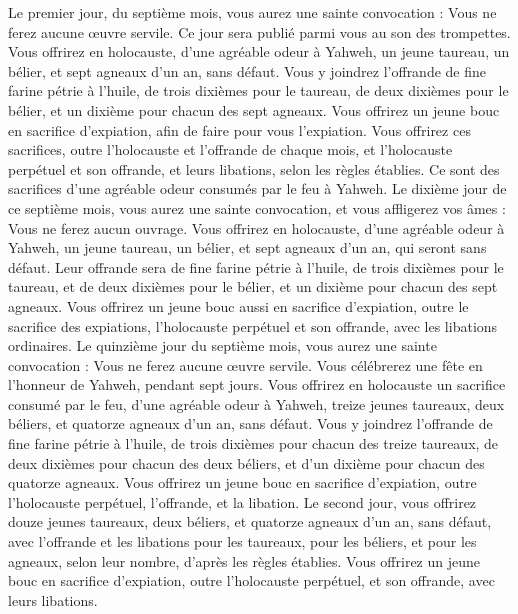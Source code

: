 \begin{multicols}{2}
\VerseOne{}Le premier jour, du septième mois, vous aurez une sainte convocation : Vous ne ferez aucune œuvre servile. Ce jour sera publié parmi vous au son des trompettes.
Vous offrirez en holocauste, d’une agréable odeur à Yahweh, un jeune taureau, un bélier, et sept agneaux d'un an, sans défaut.
Vous y joindrez l’offrande de fine farine pétrie à l'huile, de trois dixièmes pour le taureau, de deux dixièmes pour le bélier,
et un dixième pour chacun des sept agneaux.
Vous offrirez un jeune bouc en sacrifice d’expiation, afin de faire pour vous l’expiation.
Vous offrirez ces sacrifices, outre l'holocauste et l’offrande de chaque mois, et l'holocauste perpétuel et son offrande, et leurs libations, selon les règles établies. Ce sont des sacrifices d’une agréable odeur consumés par le feu à Yahweh.
Le dixième jour de ce septième mois, vous aurez une sainte convocation, et vous affligerez vos âmes : Vous ne ferez aucun ouvrage.
Vous offrirez en holocauste, d’une agréable odeur à Yahweh, un jeune taureau, un bélier, et sept agneaux d'un an, qui seront sans défaut.
Leur offrande sera de fine farine pétrie à l'huile, de trois dixièmes pour le taureau, et de deux dixièmes pour le bélier,
et un dixième pour chacun des sept agneaux.
Vous offrirez un jeune bouc aussi en sacrifice d’expiation, outre le sacrifice des expiations, l'holocauste perpétuel et son offrande, avec les libations ordinaires.
Le quinzième jour du septième mois, vous aurez une sainte convocation : Vous ne ferez aucune œuvre servile. Vous célébrerez une fête en l’honneur de Yahweh, pendant sept jours.
Vous offrirez en holocauste un sacrifice consumé par le feu, d’une agréable odeur à Yahweh, treize jeunes taureaux, deux béliers, et quatorze agneaux d'un an, sans défaut.
Vous y joindrez l’offrande de fine farine pétrie à l'huile, de trois dixièmes pour chacun des treize taureaux, de deux dixièmes pour chacun des deux béliers,
et d'un dixième pour chacun des quatorze agneaux.
Vous offrirez un jeune bouc en sacrifice d’expiation, outre l'holocauste perpétuel, l’offrande, et la libation.
Le second jour, vous offrirez douze jeunes taureaux, deux béliers, et quatorze agneaux d'un an, sans défaut,
avec l’offrande et les libations pour les taureaux, pour les béliers, et pour les agneaux, selon leur nombre, d’après les règles établies.
Vous offrirez un jeune bouc en sacrifice d’expiation, outre l'holocauste perpétuel, et son offrande, avec leurs libations.

\end{multicols}
